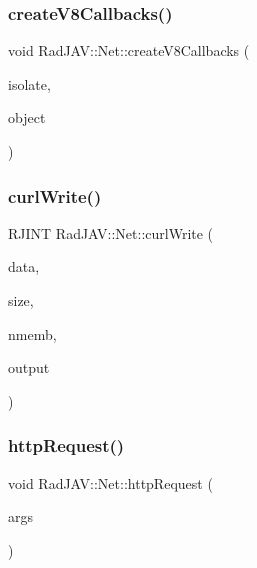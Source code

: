 \mbox{\label{class_rad_j_a_v_1_1_net_a92ffc903f2cc258d6b0bb5aca8708e2f}} 
\subsubsection{\texorpdfstring{create\+V8\+Callbacks()}{createV8Callbacks()}}
{\footnotesize\ttfamily void Rad\+J\+A\+V\+::\+Net\+::create\+V8\+Callbacks (\begin{DoxyParamCaption}\item[{v8\+::\+Isolate $\ast$}]{isolate,  }\item[{v8\+::\+Local$<$ v8\+::\+Object $>$}]{object }\end{DoxyParamCaption})\hspace{0.3cm}{\ttfamily [static]}}

\mbox{\label{class_rad_j_a_v_1_1_net_ab31cf79fc09c3984b8ead72fb4cf5310}} 
\subsubsection{\texorpdfstring{curl\+Write()}{curlWrite()}}
{\footnotesize\ttfamily R\+J\+I\+NT Rad\+J\+A\+V\+::\+Net\+::curl\+Write (\begin{DoxyParamCaption}\item[{R\+J\+C\+H\+AR $\ast$}]{data,  }\item[{R\+J\+U\+I\+NT}]{size,  }\item[{R\+J\+U\+I\+NT}]{nmemb,  }\item[{\mbox{\hyperlink{class_rad_j_a_v_1_1_string}{String}} $\ast$}]{output }\end{DoxyParamCaption})\hspace{0.3cm}{\ttfamily [static]}}

\mbox{\label{class_rad_j_a_v_1_1_net_aecb0204afd2463828edd5e8904800b79}} 
\subsubsection{\texorpdfstring{http\+Request()}{httpRequest()}}
{\footnotesize\ttfamily void Rad\+J\+A\+V\+::\+Net\+::http\+Request (\begin{DoxyParamCaption}\item[{const v8\+::\+Function\+Callback\+Info$<$ v8\+::\+Value $>$ \&}]{args }\end{DoxyParamCaption})\hspace{0.3cm}{\ttfamily [static]}}



